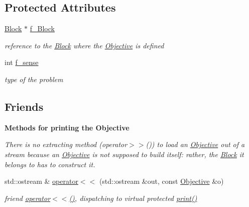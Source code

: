 \subsection*{Protected Attributes}
\begin{DoxyCompactItemize}
\item 
\mbox{\label{class_s_m_spp__di__unipi__it_1_1_objective_a372d458e214710b23cf375b9a6edc5fc}} 
\mbox{\hyperlink{class_s_m_spp__di__unipi__it_1_1_block}{Block}} $\ast$ \mbox{\hyperlink{class_s_m_spp__di__unipi__it_1_1_objective_a372d458e214710b23cf375b9a6edc5fc}{f\+\_\+\+Block}}
\begin{DoxyCompactList}\small\item\em reference to the \mbox{\hyperlink{class_s_m_spp__di__unipi__it_1_1_block}{Block}} where the \mbox{\hyperlink{class_s_m_spp__di__unipi__it_1_1_objective}{Objective}} is defined \end{DoxyCompactList}\item 
int \mbox{\hyperlink{class_s_m_spp__di__unipi__it_1_1_objective_afd682bff68e0e4bc7e2d8e9607b3847d}{f\+\_\+sense}}
\begin{DoxyCompactList}\small\item\em type of the problem \end{DoxyCompactList}\end{DoxyCompactItemize}
\subsection*{Friends}
\begin{Indent}\textbf{ Methods for printing the Objective}\par
{\em There is no extracting method (operator$>$$>$()) to load an \mbox{\hyperlink{class_s_m_spp__di__unipi__it_1_1_objective}{Objective}} out of a stream because an \mbox{\hyperlink{class_s_m_spp__di__unipi__it_1_1_objective}{Objective}} is not supposed to build itself\+: rather, the \mbox{\hyperlink{class_s_m_spp__di__unipi__it_1_1_block}{Block}} it belongs to has to construct it. }\begin{DoxyCompactItemize}
\item 
std\+::ostream \& \mbox{\hyperlink{class_s_m_spp__di__unipi__it_1_1_objective_a204a6bc05702d546cc2f487ce03ddac9}{operator$<$$<$}} (std\+::ostream \&out, const \mbox{\hyperlink{class_s_m_spp__di__unipi__it_1_1_objective}{Objective}} \&o)
\begin{DoxyCompactList}\small\item\em friend \mbox{\hyperlink{class_s_m_spp__di__unipi__it_1_1_objective_a204a6bc05702d546cc2f487ce03ddac9}{operator$<$$<$()}}, dispatching to virtual protected \mbox{\hyperlink{class_s_m_spp__di__unipi__it_1_1_objective_a2e7b9c9148a98c5c342e8c25cac95926}{print()}} \end{DoxyCompactList}\end{DoxyCompactItemize}
\end{Indent}


